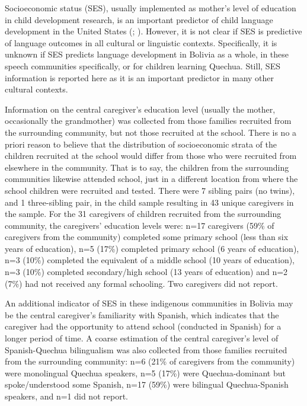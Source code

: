 \documentclass[a4paper,man,floatsintext,natbib,donotrepeattitle, apacite]{apa6}
\begin{document}
Socioeconomic status (SES), usually implemented as mother's level of education in child development research, is an important predictor of child language development in the United States (\citealt{paceIdentifyingPathwaysSocioeconomic2017}; \citealt{hoffSpecificityEnvironmentalInfluence2003}). However, it is not clear if SES is predictive of language outcomes in all cultural or linguistic contexts. Specifically, it is unknown if SES predicts language development in Bolivia as a whole, in these speech communities specifically, or for children learning Quechua. Still, SES information is reported here as it is an important predictor in many other cultural contexts. 

Information on the central caregiver's education level (usually the mother, occasionally the grandmother) was collected from those families recruited from the surrounding community, but not those recruited at the school. There is no a priori reason to believe that the distribution of socioeconomic strata of the children recruited at the school would differ from those who were recruited from elsewhere in the community. That is to say, the children from the surrounding communities likewise attended school, just in a different location from where the school children were recruited and tested. There were 7 sibling pairs (no twins), and 1 three-sibling pair, in the child sample resulting in 43 unique caregivers in the sample. For the 31 caregivers of children recruited from the surrounding community, the caregivers' education levels were: n=17 caregivers (59\% of caregivers from the community) completed some primary school (less than six years of education), n=5 (17\%) completed primary school (6 years of education), n=3 (10\%) completed the equivalent of a middle school (10 years of education), n=3 (10\%) completed secondary/high school (13 years of education) and n=2 (7\%) had not received any formal schooling. Two caregivers did not report.  

An additional indicator of SES in these indigenous communities in Bolivia may be the central caregiver's familiarity with Spanish, which indicates that the caregiver had the opportunity to attend school (conducted in Spanish) for a longer period of time. A coarse estimation of the central caregiver's level of Spanish-Quechua bilingualism was also collected from those families recruited from the surrounding community: n=6 (21\% of caregivers from the community) were monolingual Quechua speakers, n=5 (17\%) were Quechua-dominant but spoke/understood some Spanish, n=17 (59\%) were bilingual Quechua-Spanish speakers, and n=1 did not report. 
\end{document}
